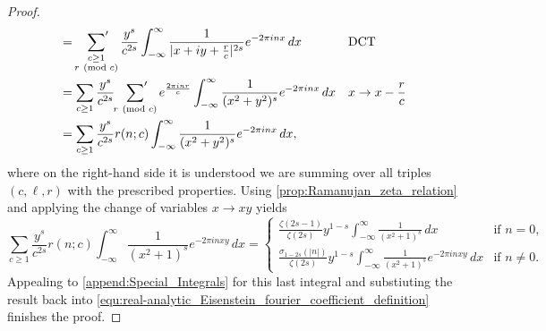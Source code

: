 \documentclass[12pt]{book}
\theoremstyle{definition}\newframedtheorem{method}{Method}
\newcommand{\psum}{\sideset{}{'}\sum}
\newcommand{\tmod}[1]{\ \left(\text{mod }#1\right)}
\newcommand{\z}{\zeta}
\newcommand{\s}{\sigma}
\newcommand{\<}{\langle}
\renewcommand{\>}{\rangle}
\begin{document}
\begin{proof}
\begin{align*}
          &= \psum_{\substack{c \ge 1 \\ r \tmod{c}}}\frac{y^{s}}{c^{2s}}\int_{-\infty}^{\infty}\frac{1}{|x+iy+\frac{r}{c}|^{2s}}e^{-2\pi inx}\,dx &&\text{DCT} \\
          &= \sum_{c \ge 1}\frac{y^{s}}{c^{2s}}\psum_{r \tmod{c}}e^{\frac{2\pi inr}{c}}\int_{-\infty}^{\infty}\frac{1}{(x^{2}+y^{2})^{s}}e^{-2\pi inx}\,dx &&\text{$x \to x-\frac{r}{c}$} \\
          &= \sum_{c \ge 1}\frac{y^{s}}{c^{2s}}r(n;c)\int_{-\infty}^{\infty}\frac{1}{(x^{2}+y^{2})^{s}}e^{-2\pi inx}\,dx,
        \end{align*}
        where on the right-hand side it is understood we are summing over all triples $(c,\ell,r)$ with the prescribed properties. Using \cref{prop:Ramanujan_zeta_relation} and applying the change of variables $x \to xy$ yields
        \[
          \sum_{c \ge 1}\frac{y^{s}}{c^{2s}}r(n;c)\int_{-\infty}^{\infty}\frac{1}{(x^{2}+1)^{s}}e^{-2\pi inxy}\,dx = \begin{cases} \frac{\z(2s-1)}{\z(2s)}y^{1-s}\int_{-\infty}^{\infty}\frac{1}{(x^{2}+1)^{s}}\,dx & \text{if $n = 0$}, \\
          \frac{\s_{1-2s}(|n|)}{\z(2s)}y^{1-s}\int_{-\infty}^{\infty}\frac{1}{(x^{2}+1)^{s}}e^{-2\pi inxy}\,dx & \text{if $n \neq 0$}. \end{cases}
        \]
        Appealing to \cref{append:Special_Integrals} for this last integral and substiuting the result back into \cref{equ:real-analytic_Eisenstein_fourier_coefficient_definition} finishes the proof.
      \end{proof}
\end{document}
